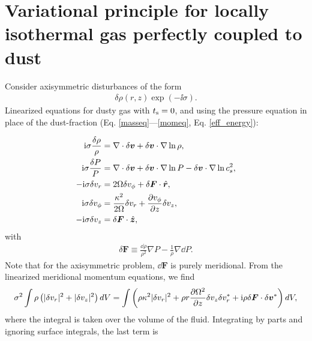 \section{Variational principle for locally isothermal gas perfectly
  coupled to dust}\label{var_prin}

Consider axisymmetric disturbances of the form
\begin{align}
  \delta\rho(r,z)\exp{\left(-\ii\sigma\right)}. 
\end{align}
Linearized equations for dusty gas with $t_\mathrm{s}=0$, and using the
pressure equation in place of the dust-fraction
(Eq. \ref{masseq}---\ref{momeq}, Eq. \ref{eff_energy}): 

\begin{align}
  \mathrm{i}\sigma\frac{\delta\rho}{\rho} &= \nabla\cdot\delta\bm{v} +
  \delta\bm{v}\cdot\nabla\ln{\rho},\\
  \mathrm{i}\sigma\frac{\delta P}{P} &= \nabla\cdot\delta\bm{v} +
  \delta\bm{v}\cdot\nabla\ln{P} - \delta\bm{v}\cdot\nabla\ln{c_s^2},\\
  -\mathrm{i}\sigma\delta v_r  &= 2\Omega\delta v_\phi + 
  \delta\bm{F}\cdot\hat{\bm{r}},\\
  \mathrm{i}\sigma\delta v_\phi &= \frac{\kappa^2}{2\Omega}\delta v_r + \frac{\partial
    v_\phi}{\partial z}\delta v_z,\\
  -\mathrm{i}\sigma\delta v_z &=  \delta\bm{F}\cdot\hat{\bm{z}},
\end{align} 
with
\begin{align}
  \delta \bm{F} \equiv \frac{\dd\rho}{\rho^2}\nabla P -
  \frac{1}{\rho}\nabla\dd P.
\end{align}
Note that for the axisymmetric problem, $\dd\bm{F}$ is purely
meridional. 
From the linearized meridional momentum equations, we find 
\begin{align}
  \sigma^2\int\rho\left(|\delta v_r|^2 + |\delta v_z|^2\right)dV = \int\left( \rho
  \kappa^2 |\delta v_r|^2 + \rho r\frac{\partial \Omega^2}{\partial z} \delta v_z \delta
  v_r^*  + \mathrm{i} \rho \delta \bm{F}\cdot\delta\bm{v}^*
  \right)dV,
\end{align}
where the integral is taken over the volume of the fluid. Integrating
by parts and ignoring surface integrals, the last term is
